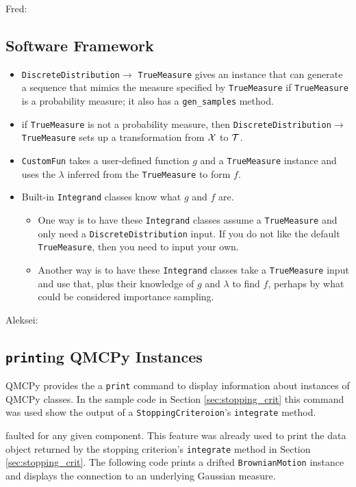 \documentclass[graybox,footinfo]{svmult}
\newcommand{\AGSComment}[1]{{\color{cyan} Aleksei: #1}}
\newcommand{\FJHComment}[1]{{\color{magenta} Fred: #1}}
\begin{document}
\FJHComment{

\subsection{Software Framework}

\newcommand{\dd}{\texttt{DiscreteDistribution}\xspace}
\newcommand{\tm}{\texttt{TrueMeasure}\xspace}

\begin{itemize}
\item \dd $\rightarrow$ \tm gives an instance that can generate a sequence that mimics the measure specified by \tm if \tm is a probability measure; it also has a \texttt{gen\_samples} method.

\item if \tm is not a probability measure, then \dd $\rightarrow$ \tm sets up a transformation from ${\mathcal{X}}$ to ${\mathcal{T}}$.

\item \texttt{CustomFun} takes a user-defined function $g$ and a \tm instance and uses the $\lambda$ inferred from the \tm to form $f$.

\item Built-in \texttt{Integrand} classes know what $g$ and $f$ are.

\begin{itemize}
    \item One way is to have these \texttt{Integrand} classes assume a \tm and only need a \dd input. If you do not like the default \tm, then you need to input your own.
    
    \item Another way is to have these \texttt{Integrand} classes take a \tm input and use that, plus their knowledge of $g$ and $\lambda$ to find $f$, perhaps by what could be considered importance sampling.
    
\end{itemize}
\end{itemize}
}

\AGSComment{
\subsection{\texttt{print}ing  QMCPy Instances}

QMCPy provides the a \texttt{print} command to display information about instances of QMCPy classes. In the sample code in Section \ref{sec:stopping_crit} this command was used show the output of a \texttt{StoppingCriteroion}'s \texttt{integrate} method.

faulted for any given component. This feature was already used to print the data object returned by the stopping criterion's \texttt{integrate} method in Section \ref{sec:stopping_crit}. The following code prints a drifted \texttt{BrownianMotion} instance and displays the connection to an underlying Gaussian measure. 
}
\end{document}
